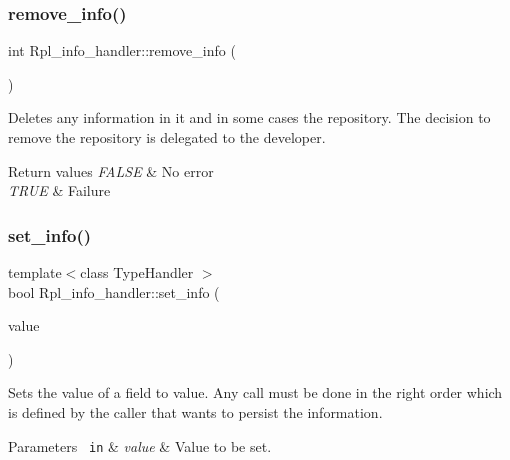 \subsubsection{\texorpdfstring{remove\+\_\+info()}{remove\_info()}}
{\footnotesize\ttfamily int Rpl\+\_\+info\+\_\+handler\+::remove\+\_\+info (\begin{DoxyParamCaption}{ }\end{DoxyParamCaption})\hspace{0.3cm}{\ttfamily [inline]}}

Deletes any information in it and in some cases the repository. The decision to remove the repository is delegated to the developer.


\begin{DoxyRetVals}{Return values}
{\em F\+A\+L\+SE} & No error \\
\hline
{\em T\+R\+UE} & Failure \\
\hline
\end{DoxyRetVals}
\mbox{\label{classRpl__info__handler_a8068f40bbccae426a48bb055b7c7f776}} 
\subsubsection{\texorpdfstring{set\+\_\+info()}{set\_info()}\hspace{0.1cm}{\footnotesize\ttfamily [1/2]}}
{\footnotesize\ttfamily template$<$class Type\+Handler $>$ \\
bool Rpl\+\_\+info\+\_\+handler\+::set\+\_\+info (\begin{DoxyParamCaption}\item[{Type\+Handler const}]{value }\end{DoxyParamCaption})\hspace{0.3cm}{\ttfamily [inline]}}

Sets the value of a field to {\ttfamily value}. Any call must be done in the right order which is defined by the caller that wants to persist the information.


\begin{DoxyParams}[1]{Parameters}
\mbox{\texttt{ in}}  & {\em value} & Value to be set.\\
\hline
\end{DoxyParams}

